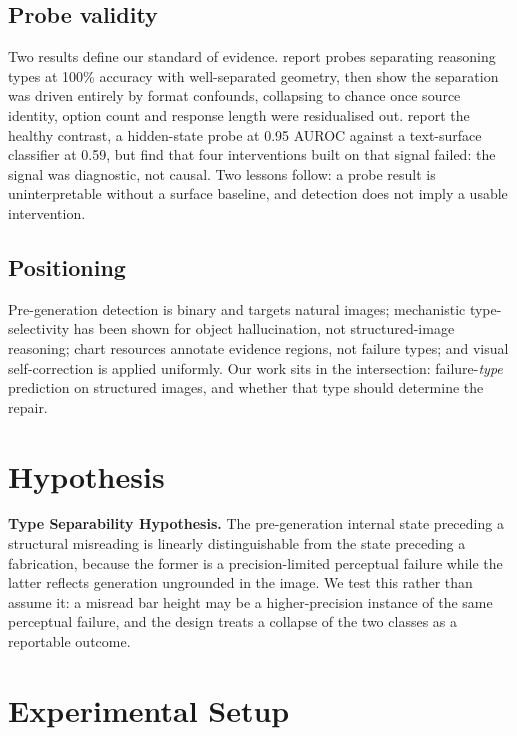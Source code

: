 \documentclass[11pt]{article}
\begin{document}
\subsection{Probe validity}
Two results define our standard of evidence. \citet{sahoo2026linearprobes}
report probes separating reasoning types at 100\% accuracy with well-separated
geometry, then show the separation was driven entirely by format confounds,
collapsing to chance once source identity, option count and response length were
residualised out. \citet{yuan2026hiddenerror} report the healthy contrast, a
hidden-state probe at 0.95 AUROC against a text-surface classifier at 0.59, but
find that four interventions built on that signal failed: the signal was
diagnostic, not causal. Two lessons follow: a probe result is uninterpretable
without a surface baseline, and detection does not imply a usable intervention.

\subsection{Positioning}
Pre-generation detection is binary and targets natural images; mechanistic
type-selectivity has been shown for object hallucination, not structured-image
reasoning; chart resources annotate evidence regions, not failure types; and
visual self-correction is applied uniformly. Our work sits in the intersection:
failure-\emph{type} prediction on structured images, and whether that type
should determine the repair.

\section{Hypothesis}

\textbf{Type Separability Hypothesis.} The pre-generation internal state
preceding a structural misreading is linearly distinguishable from the state
preceding a fabrication, because the former is a precision-limited perceptual
failure while the latter reflects generation ungrounded in the image. We test
this rather than assume it: a misread bar height may be a higher-precision
instance of the same perceptual failure, and the design treats a collapse of the
two classes as a reportable outcome.

\section{Experimental Setup}
\label{sec:setup}
\end{document}
